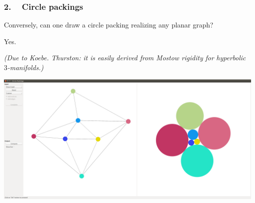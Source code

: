 \begin{frame}
\frametitle{2. ~ Circle packings}


\medskip 
Conversely, can one draw a circle packing realizing any planar graph?

\smallskip \pause
\begin{theorem}
\pause Yes.
\end{theorem}

\smallskip \pause
\emph{\small (Due to Koebe. Thurston: it is easily derived from Mostow rigidity for hyperbolic $3$-manifolds.)}



\medskip \pause
\begin{center}
\includegraphics[width=\textwidth]{images/Screenshot1-c.png}
\end{center}

\end{frame}
